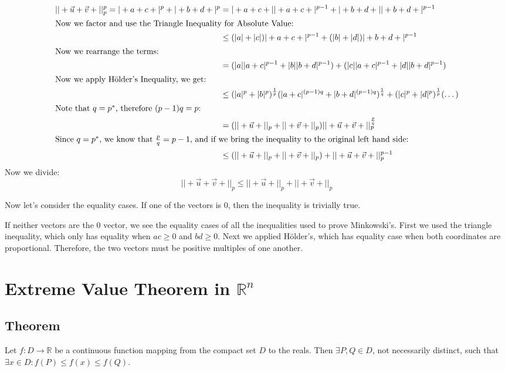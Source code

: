 \documentclass[11 pt, twoside]{article}
\begin{document}
\begin{align*}
||+\vec{u} + \vec{v}+||_p^p = |+a + c+|^p + |+b + d+|^p &= |+a + c+||+a + c+|^{p - 1} + |+b + d+||+b + d+|^{p - 1}\\
\intertext{Now we factor and use the Triangle Inequality for Absolute Value:}
&\leq (|a| + |c|)|+a + c+|^{p - 1} + (|b| + |d|)|+b + d+|^{p - 1}\\
\intertext{Now we rearrange the terms:}
&= (|a||a + c|^{p - 1} + |b||b + d|^{p - 1}) + (|c||a + c|^{p - 1} + |d||b +
d|^{p - 1})\\
\intertext{Now we apply H\"{o}lder's Inequality, we get:}
&\leq (|a|^p + |b|^p)^{\frac{1}{p}}(|a + c|^{(p - 1)q} + |b + d|^{(p -
1)q})^{\frac{1}{q}} + (|c|^p + |d|^p)^{\frac{1}{p}}(\dots)\\
\intertext{Note that $q = p^*$, therefore $(p - 1)q = p$:}
&= (||+\vec{u}+||_p + ||+\vec{v}+||_p) ||+\vec{u} + \vec{v}+||_p^{\frac{p}{q}}\\
\intertext{Since $q = p^*$, we know that $\frac{p}{q} = p - 1$, and if we bring the
inequality to the original left hand side:}
&\leq (||+\vec{u}+||_p + ||+\vec{v}+||_p)+||+\vec{u} + \vec{v}+||_p^{p - 1}
\end{align*}
Now we divide:
$$||+\vec{u} + \vec{v}+||_p \leq ||+\vec{u}+||_p + ||+\vec{v}+||_p$$

Now let's consider the equality cases. If one of the vectors is 0, then the
inequality is trivially true.

If neither vectors are the 0 vector, we see the equality cases of all the
inequalities used to prove Minkowski's. First we used the triangle inequality,
which only has equality when $ac \geq 0$ and $bd \geq 0$. Next we applied
H\"{o}lder's, which has equality case when both coordinates are proportional.
Therefore, the two vectors must be positive multiples of one another.

\section{Extreme Value Theorem in $\mathbb{R}^n$}
\subsection{Theorem}
Let $f : D \to \mathbb{R}$ be a continuous function mapping from the compact
set $D$ to the reals. Then $\exists P, Q \in D$, not necessarily distinct,
such that $\exists x \in D: f(P) \leq f(x) \leq f(Q)$.
\end{document}

